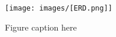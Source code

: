 \begin{figure}[h]
\centering
\texttt{[image: images/[ERD.png]]}
\caption{\label{fig:figure4.1} Figure caption here}
\end{figure}